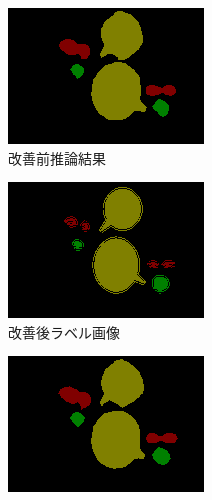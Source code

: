 \documentclass[onecolumn]{ujarticle}   %
\begin{document}
\begin{figure}[hb]
\begin{subfigure}{0.49\columnwidth}
			\includegraphics[width=1.0\columnwidth]{data/predict_test_2.png}
			\caption{改善前推論結果}
		\end{subfigure}
		\begin{subfigure}{0.49\columnwidth}
			\centering
			\includegraphics[width=1.0\columnwidth]{data/after_label.png}
				\caption{改善後ラベル画像}
		\end{subfigure}
		\begin{subfigure}{0.49\columnwidth}
			\centering
			\includegraphics[width=1.0\columnwidth]{data/after_predict.png}

\end{subfigure}
\end{figure}
\end{document}
